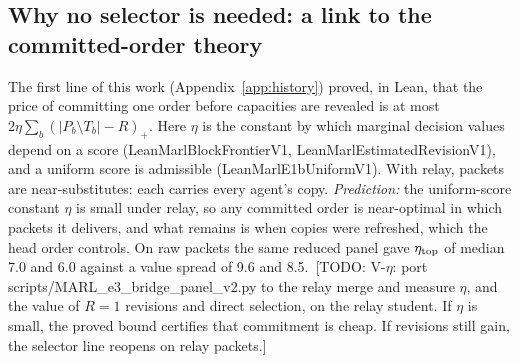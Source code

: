 \documentclass[11pt]{article}
\theoremstyle{definition}
\newcommand{\lean}[1]{\textsf{\footnotesize #1}}
\newif\ifshownotes\shownotestrue
\newcommand{\TODO}[1]{\ifshownotes{\color{todocol}\,\textsf{\footnotesize[TODO: #1]}}\fi}
\begin{document}
\subsection{Why no selector is needed: a link to the committed-order theory}
The first line of this work (Appendix~\ref{app:history}) proved, in Lean, that the price of committing one order before
capacities are revealed is at most $2\eta\sum_b(|P_b\setminus T_b|-R)_+$. Here $\eta$ is the constant by which marginal
decision values depend on a score (\lean{LeanMarlBlockFrontierV1}, \lean{LeanMarlEstimatedRevisionV1}), and a uniform
score is admissible (\lean{LeanMarlE1bUniformV1}). With relay, packets are near-substitutes: each carries every agent's
copy. \emph{Prediction:} the uniform-score constant $\eta$ is small under relay, so any committed order is near-optimal
in which packets it delivers, and what remains is when copies were refreshed, which the head order controls. On raw
packets the same reduced panel gave $\eta_{\rm top}$ of median 7.0 and 6.0 against a value spread of 9.6 and 8.5.
\TODO{V-$\eta$: port scripts/MARL\_e3\_bridge\_panel\_v2.py to the relay merge and measure $\eta$, and the value of $R=1$
revisions and direct selection, on the relay student. If $\eta$ is small, the proved bound certifies that commitment is
cheap. If revisions still gain, the selector line reopens on relay packets.}
\end{document}
